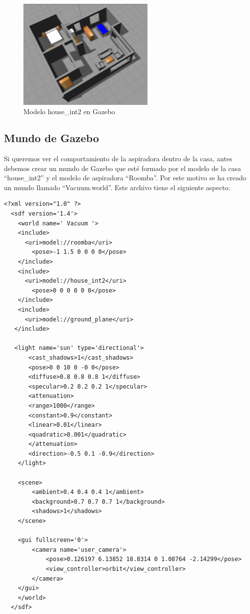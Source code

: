 \begin{figure}[H]
  \begin{center}
    \includegraphics[width=0.6\textwidth]{figures/Vacuum/casa.png}
		\caption{Modelo house\_int2 en Gazebo}
		\label{fig.casa}
		\end{center}
\end{figure}

\subsection{Mundo de Gazebo}
Si queremos ver el comportamiento de la aspiradora dentro de la casa, antes debemos crear un mundo de Gazebo que esté formado por el modelo de la casa ``house\_int2'' y el modelo de aspiradora ``Roomba''. Por este motivo se ha creado un mundo llamado ``Vacuum.world''. Este archivo tiene el siguiente aspecto:

\vspace{20pt}
	\begin{lstlisting}[frame=single]
<?xml version="1.0" ?>
  <sdf version='1.4'>
    <world name=' Vacuum '>
    <include>
      <uri>model://roomba</uri>
        <pose>-1 1.5 0 0 0 0</pose>
    </include>
    <include>
      <uri>model://house_int2</uri>
        <pose>0 0 0 0 0 0</pose>
    </include>
    <include>
      <uri>model://ground_plane</uri>
   </include>

   <light name='sun' type='directional'>
       <cast_shadows>1</cast_shadows>
       <pose>0 0 10 0 -0 0</pose>
       <diffuse>0.8 0.8 0.8 1</diffuse>
       <specular>0.2 0.2 0.2 1</specular>
       <attenuation>
       <range>1000</range>
       <constant>0.9</constant>
       <linear>0.01</linear>
       <quadratic>0.001</quadratic>
       </attenuation>
       <direction>-0.5 0.1 -0.9</direction>
    </light>

    <scene>
        <ambient>0.4 0.4 0.4 1</ambient>
        <background>0.7 0.7 0.7 1</background>
        <shadows>1</shadows>
    </scene>

    <gui fullscreen='0'>
        <camera name='user_camera'>
            <pose>0.126197 6.13852 18.8314 0 1.08764 -2.14299</pose>
            <view_controller>orbit</view_controller>
        </camera>
    </gui>
    </world>
  </sdf>

	\end{lstlisting}


